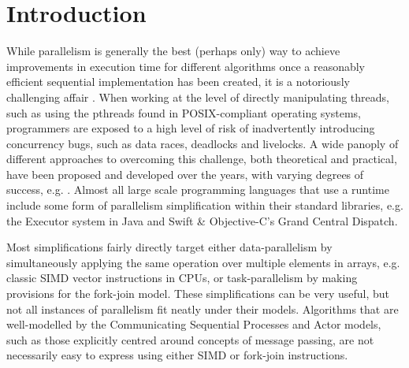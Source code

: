 \section{Introduction}
% 
% 
% 
% 
While parallelism is generally the best (perhaps only) way to achieve improvements in execution time for different algorithms once a reasonably efficient sequential implementation has been created, it is a notoriously challenging affair \cite{Shun2017}.  When working at the level of directly manipulating threads, such as using the pthreads found in POSIX-compliant operating systems, programmers are exposed to a high level of risk of inadvertently introducing concurrency bugs, such as data races, deadlocks and livelocks.  A wide panoply of different approaches to overcoming this challenge, both theoretical and practical, have been proposed and developed over the years, with varying degrees of success, e.g. \cite{Boyapati2002,Bocq2012,Seinstra2004}.  Almost all large scale programming languages that use a runtime include some form of parallelism simplification within their standard libraries, e.g. the Executor system in Java and Swift \& Objective-C's Grand Central Dispatch.

Most simplifications fairly directly target either data-parallelism by simultaneously applying the same operation over multiple elements in arrays, e.g. classic SIMD vector instructions in CPUs, or task-parallelism by making provisions for the fork-join model.  These simplifications can be very useful, but not all instances of parallelism fit neatly under their models.  Algorithms that are well-modelled by the Communicating Sequential Processes \cite{Hoare1985} and Actor \cite{Agha1997} models, such as those explicitly centred around concepts of message passing, are not necessarily easy to express using either SIMD or fork-join instructions.

